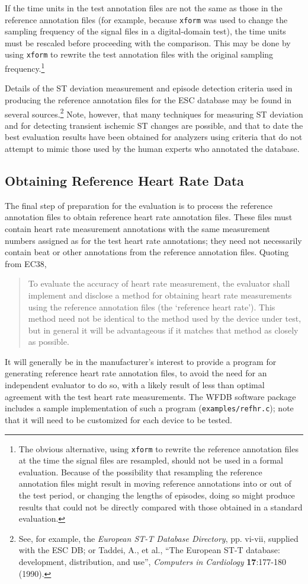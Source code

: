 If the time units in the test annotation files are not the same as those in
the reference annotation files (for example, because {\tt xform} was used to
change the sampling frequency of the signal files in a digital-domain test),
the time units must be rescaled before proceeding with the comparison.  This
may be done by using {\tt xform} to rewrite the test annotation files with
the original sampling frequency.\footnote{
The obvious alternative, using {\tt xform} to rewrite the reference annotation
files at the time the signal files are resampled, should not be used in a
formal evaluation.  Because of the possibility that resampling the reference
annotation files might result in moving reference annotations into or out of
the test period, or changing the lengths of episodes, doing so might produce
results that could not be directly compared with those obtained in a standard
evaluation.}

Details of the ST deviation measurement and episode detection criteria used in
producing the reference annotation files for the ESC database may be found in
several sources.\footnote{ See, for example, the {\it European ST-T Database
Directory}, pp. vi-vii, supplied with the ESC DB; or Taddei, A., et al., ``The
European ST-T database: development, distribution, and use'', {\it Computers
in Cardiology} {\bf 17}:177-180 (1990).} Note, however, that many techniques
for measuring ST deviation and for detecting transient ischemic ST changes are
possible, and that to date the best evaluation results have been obtained for
analyzers using criteria that do not attempt to mimic those used by the human
experts who annotated the database.

\subsection{Obtaining Reference Heart Rate Data}
The final step of preparation for the evaluation is to process the
reference annotation files to obtain reference heart rate annotation
files.  These files must contain heart rate measurement annotations
with the same measurement numbers assigned as for the test heart rate
annotations; they need not necessarily contain beat or other
annotations from the reference annotation files.  Quoting from EC38,
\begin{quote}
To evaluate the accuracy of heart rate measurement, the evaluator
shall implement and disclose a method for obtaining heart rate
measurements using the reference annotation files (the `reference
heart rate').  This method need not be identical to the method used by
the device under test, but in general it will be advantageous if it
matches that method as closely as possible.
\end{quote}
It will generally be in the manufacturer's interest to provide a
program for generating reference heart rate annotation files, to avoid
the need for an independent evaluator to do so, with a likely result
of less than optimal agreement with the test heart rate measurements.
The WFDB software package includes a sample implementation of such a
program ({\tt examples/refhr.c}); note that it will need to be
customized for each device to be tested.

